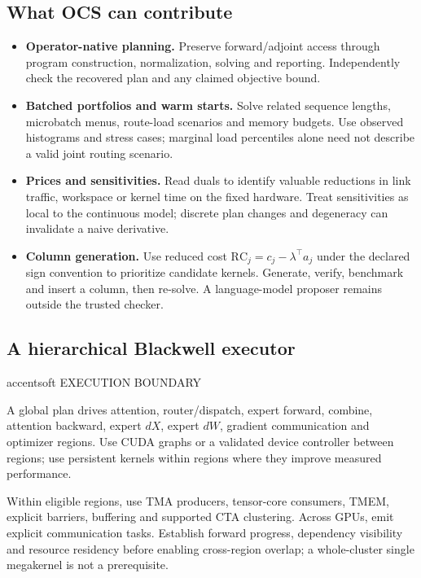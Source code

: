 \documentclass[10pt]{article}
\newcommand{\mono}{\ttfamily}
\newenvironment{callA}{\begin{callbox}[accent]{accentsoft}}{\end{callbox}}
\newcommand{\ct}[1]{{\mono\fontsize{7.2}{8}\selectfont\color{ink2}\MakeUppercase{#1}}\par\vspace{2pt}}
\newenvironment{tight}
  {\begin{itemize}[leftmargin=13pt,itemsep=4pt,topsep=4pt,parsep=0pt,
     label=\textcolor{ink3}{\footnotesize$\bullet$}]\color{ink2}}
  {\end{itemize}}
\begin{document}
\subsection{What OCS can contribute}
\begin{tight}
\item \textbf{\color{ink}Operator-native planning.} Preserve forward/adjoint
access through program construction, normalization, solving and reporting.
Independently check the recovered plan and any claimed objective bound.
\item \textbf{\color{ink}Batched portfolios and warm starts.} Solve related
sequence lengths, microbatch menus, route-load scenarios and memory budgets.
Use observed histograms and stress cases; marginal load percentiles alone need
not describe a valid joint routing scenario.
\item \textbf{\color{ink}Prices and sensitivities.} Read duals to identify
valuable reductions in link traffic, workspace or kernel time on the fixed
hardware. Treat sensitivities as local to the continuous model; discrete plan
changes and degeneracy can invalidate a naive derivative.
\item \textbf{\color{ink}Column generation.} Use reduced cost
$\mathrm{RC}_j=c_j-\lambda^\top a_j$ under the declared sign convention to
prioritize candidate kernels. Generate, verify, benchmark and insert a column,
then re-solve. A language-model proposer remains outside the trusted checker.
\end{tight}

\subsection{A hierarchical Blackwell executor}
\begin{callA}
\ct{Execution boundary}
A global plan drives attention, router/dispatch, expert forward, combine,
attention backward, expert $dX$, expert $dW$, gradient communication and optimizer
regions. Use CUDA graphs or a validated device controller between regions;
use persistent kernels within regions where they improve measured performance.
\end{callA}
Within eligible regions, use TMA producers, tensor-core consumers, TMEM,
explicit barriers, buffering and supported CTA clustering. Across GPUs, emit
explicit communication tasks. Establish forward progress, dependency visibility
and resource residency before enabling cross-region overlap; a whole-cluster
single megakernel is not a prerequisite.
\end{document}
